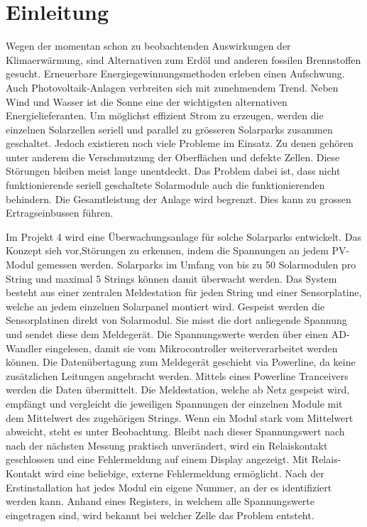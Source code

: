 \section{Einleitung}


Wegen der momentan schon zu beobachtenden Auswirkungen der Klimaerwärmung, sind Alternativen zum Erdöl und anderen fossilen Brennstoffen gesucht. Erneuerbare Energiegewinnungsmethoden erleben einen Aufschwung. Auch Photovoltaik-Anlagen verbreiten sich mit zunehmendem Trend. Neben Wind und Wasser ist die Sonne eine der wichtigsten alternativen Energielieferanten. Um möglichst effizient Strom zu erzeugen, werden die einzelnen Solarzellen seriell und parallel zu grösseren Solarparks zusammen geschaltet. Jedoch existieren noch viele Probleme im Einsatz. Zu denen gehören unter anderem die Verschmutzung der Oberflächen und defekte Zellen. Diese Störungen bleiben meist lange unentdeckt. Das Problem dabei ist, dass nicht funktionierende seriell geschaltete Solarmodule auch die funktionierenden behindern. Die Gesamtleistung der Anlage wird begrenzt. Dies kann zu grossen Ertragseinbussen führen.


Im Projekt 4 wird eine Überwachungsanlage für solche Solarparks entwickelt. Das Konzept sieh vor,Störungen zu erkennen, indem die Spannungen an jedem PV-Modul gemessen werden. Solarparks im Umfang von bis zu 50 Solarmodulen pro String und maximal 5 Strings können damit überwacht werden. Das System besteht aus einer zentralen Meldestation für jeden String und einer Sensorplatine, welche an jedem einzelnen Solarpanel montiert wird. Gespeist werden die Sensorplatinen direkt von Solarmodul. Sie misst die dort anliegende Spannung und sendet diese dem Meldegerät. Die Spannungswerte werden über einen AD-Wandler eingelesen, damit sie vom Mikrocontroller weiterverarbeitet werden können. Die Datenübertagung zum Meldegerät geschieht via Powerline, da keine zusätzlichen Leitungen angebracht werden. Mittels eines Powerline Tranceivers werden die Daten übermittelt. Die Meldestation, welche ab Netz gespeist wird, empfängt und vergleicht die jeweiligen Spannungen der einzelnen Module mit dem Mittelwert des zugehörigen Strings. Wenn ein Modul stark vom Mittelwert abweicht, steht es unter Beobachtung. Bleibt nach dieser Spannungswert nach nach der nächsten Messung praktisch unverändert,  wird ein Relaiskontakt geschlossen und eine Fehlermeldung auf einem Display angezeigt. Mit Relais-Kontakt wird eine beliebige, externe Fehlermeldung ermöglicht. Nach der Erstinstallation hat jedes Modul ein eigene Nummer, an der es identifiziert werden kann. Anhand eines Registers, in welchem alle Spannungswerte eingetragen sind, wird bekannt bei welcher Zelle das Problem entsteht.

